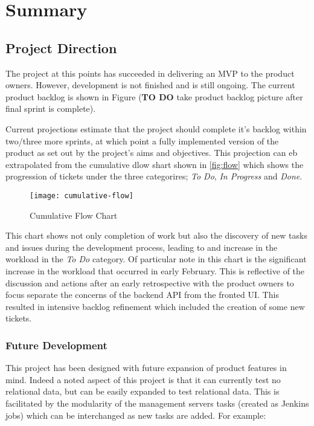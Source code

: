 \section{Summary}

  \subsection{Project Direction}
  
  The project at this points has succeeded in delivering an MVP to the product owners. However, development is not finished and is still ongoing. The current product backlog is shown in Figure (\textbf{TO DO} take product backlog picture after final sprint is complete).
  
  Current projections estimate that the project should complete it's backlog within two/three more sprints, at which point a fully implemented version of the product as set out by the project's aims and objectives. This projection can eb extrapolated from the cumulative dlow shart shown in \autoref{fig:flow} which shows the progression of tickets under the three categorires; \textit{To Do}, \textit{In Progress} and \textit{Done}.
  
  \begin{figure}[H]
    \setlength{\belowcaptionskip}{15pt plus 3pt minus 2pt}
    \caption{Cumulative Flow Chart}
    \centering
    \texttt{[image: cumulative-flow]}
    \label{fig:flow}
  \end{figure}
  
  This chart shows not only completion of work but also the discovery of new tasks and issues during the development  process, leading to and increase in the workload in the \textit{To Do} category. Of particular note in this chart is the significant increase in the workload that occurred in early February. This is reflective of the discussion and actions after an early retrospective with the product owners to focus separate the concerns of the backend API from the fronted UI. This resulted in intensive backlog refinement which included the creation of some new tickets.
  
  \subsubsection{Future Development}
  This project has been designed with future expansion of product features in mind. Indeed a noted aspect of this project is that it can currently test no relational data, but can be easily expanded to test relational data. This is facilitated by the modularity of the management servers tasks (created as Jenkins jobs) which can be interchanged as new tasks are added. For example:
  
